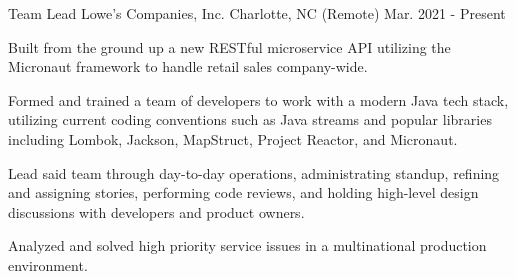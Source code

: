 

\begin{cventries}

  \cventry
    {Team Lead}
    {Lowe's Companies, Inc.}
    {Charlotte, NC (Remote)}
    {Mar. 2021 - Present}
    {
        \begin{cvitems}
            \item {Built from the ground up a new RESTful microservice API utilizing the Micronaut framework to handle retail sales company-wide.}
            \item {Formed and trained a team of developers to work with a modern Java tech stack, utilizing current coding conventions such as Java streams and popular libraries including Lombok, Jackson, MapStruct, Project Reactor, and Micronaut.}
            \item {Lead said team through day-to-day operations, administrating standup, refining and assigning stories, performing code reviews, and holding high-level design discussions with developers and product  owners.}
            \item {Analyzed and solved high priority service issues in a multinational production environment.}
        \end{cvitems}
    }
    

\end{cventries}
